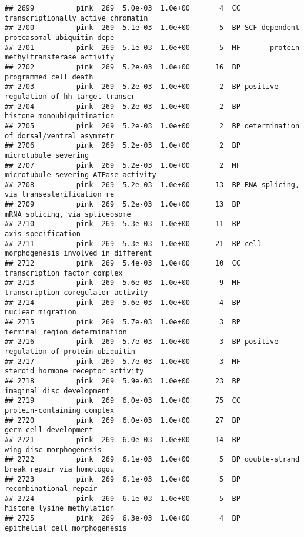\documentclass[]{article}
\begin{document}
\begin{verbatim}
## 2699          pink  269  5.0e-03  1.0e+00       4  CC       transcriptionally active chromatin
## 2700          pink  269  5.1e-03  1.0e+00       5  BP SCF-dependent proteasomal ubiquitin-depe
## 2701          pink  269  5.1e-03  1.0e+00       5  MF       protein methyltransferase activity
## 2702          pink  269  5.2e-03  1.0e+00      16  BP                    programmed cell death
## 2703          pink  269  5.2e-03  1.0e+00       2  BP positive regulation of hh target transcr
## 2704          pink  269  5.2e-03  1.0e+00       2  BP               histone monoubiquitination
## 2705          pink  269  5.2e-03  1.0e+00       2  BP determination of dorsal/ventral asymmetr
## 2706          pink  269  5.2e-03  1.0e+00       2  BP                     microtubule severing
## 2707          pink  269  5.2e-03  1.0e+00       2  MF     microtubule-severing ATPase activity
## 2708          pink  269  5.2e-03  1.0e+00      13  BP RNA splicing, via transesterification re
## 2709          pink  269  5.2e-03  1.0e+00      13  BP           mRNA splicing, via spliceosome
## 2710          pink  269  5.3e-03  1.0e+00      11  BP                       axis specification
## 2711          pink  269  5.3e-03  1.0e+00      21  BP cell morphogenesis involved in different
## 2712          pink  269  5.4e-03  1.0e+00      10  CC             transcription factor complex
## 2713          pink  269  5.6e-03  1.0e+00       9  MF       transcription coregulator activity
## 2714          pink  269  5.6e-03  1.0e+00       4  BP                        nuclear migration
## 2715          pink  269  5.7e-03  1.0e+00       3  BP            terminal region determination
## 2716          pink  269  5.7e-03  1.0e+00       3  BP positive regulation of protein ubiquitin
## 2717          pink  269  5.7e-03  1.0e+00       3  MF        steroid hormone receptor activity
## 2718          pink  269  5.9e-03  1.0e+00      23  BP                imaginal disc development
## 2719          pink  269  6.0e-03  1.0e+00      75  CC               protein-containing complex
## 2720          pink  269  6.0e-03  1.0e+00      27  BP                    germ cell development
## 2721          pink  269  6.0e-03  1.0e+00      14  BP                  wing disc morphogenesis
## 2722          pink  269  6.1e-03  1.0e+00       5  BP double-strand break repair via homologou
## 2723          pink  269  6.1e-03  1.0e+00       5  BP                   recombinational repair
## 2724          pink  269  6.1e-03  1.0e+00       5  BP               histone lysine methylation
## 2725          pink  269  6.3e-03  1.0e+00       4  BP            epithelial cell morphogenesis

\end{verbatim}
\end{document}

